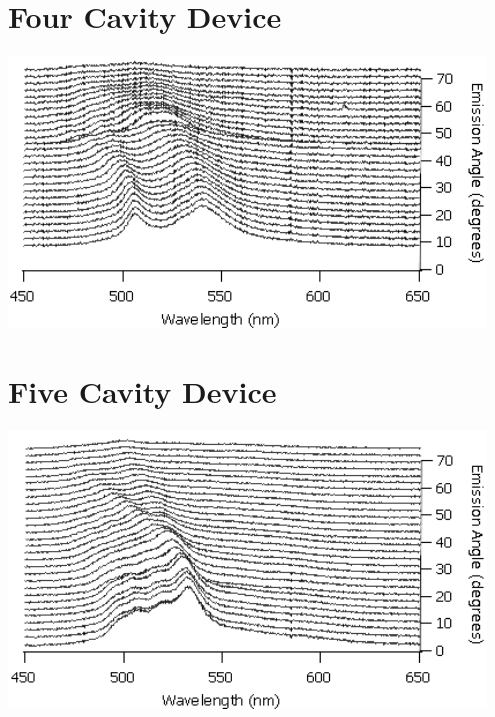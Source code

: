 \documentclass{report}
\begin{document}
    \section*{Four Cavity Device}
    \begin{center}
    \includegraphics[width=0.95\textwidth]{images/n4_waterfall.png}
    \end{center}
    
    \section*{Five Cavity Device}
    \begin{center}
    \includegraphics[width=0.95\textwidth]{images/n5_waterfall.png}
    \end{center}
\end{document}
